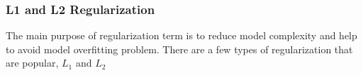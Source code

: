 \subsubsection{L1 and L2 Regularization}

The main purpose of regularization term is to reduce model complexity and help to avoid model overfitting problem. There are a few types of regularization that are popular, $L_1$ and $L_2$